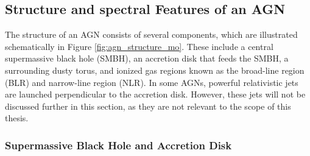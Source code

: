 \subsection{Structure and spectral Features of an AGN}
\label{sec:agn_structure}

The structure of an AGN consists of several components, which are illustrated schematically in Figure \ref{fig:agn_structure_mo}. These include a central supermassive black hole (SMBH), an accretion disk that feeds the SMBH, a surrounding dusty torus, and ionized gas regions known as the broad-line region (BLR) and narrow-line region (NLR). In some AGNs, powerful relativistic jets are launched perpendicular to the accretion disk. However, these jets will not be discussed further in this section, as they are not relevant to the scope of this thesis. 


\subsubsection{Supermassive Black Hole and Accretion Disk}


